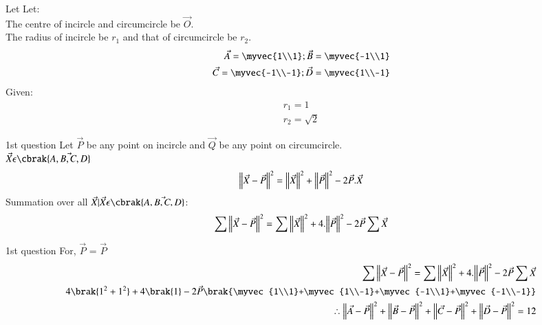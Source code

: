 \documentclass{beamer}
\begin{document}
\begin{frame}{Let}
Let:\\
The centre of incircle and circumcircle be $\vec{O}$.\\
The radius of incircle be $r_1$ and that of circumcircle be $r_2$.
\begin{align}
    \vec{A}=\myvec{1\\1};\vec{B}=\myvec{-1\\1}\\
    \vec{C}=\myvec{-1\\-1};\vec{D}=\myvec{1\\-1}
\end{align}
Given:
\begin{align}
    r_1 = 1\\
    r_2 = \sqrt{2}
\end{align}
\end{frame}

\begin{frame}{1st question}
Let $\vec{P}$ be any point on incircle and $\vec{Q}$ be any point on circumcircle.\\
$\vec{X}\epsilon \cbrak{\vec{A,B,C,D}}$
\begin{align}
    \norm{\vec{X}-\vec{P}}^2 = \norm{\vec{X}}^2 + \norm{\vec{P}}^2 - 2\vec{P}.\vec{X}\\
\end{align}
Summation over all $\vec{X}|\vec{X}\epsilon \cbrak{\vec{A,B,C,D}}$:
\begin{align}
    \sum \norm{\vec{X}-\vec{P}}^2 = \sum \norm{\vec{X}}^2 + 4.\norm{\vec{P}}^2 -2\vec{P}\sum \vec{X}\\
\end{align}
\end{frame}

\begin{frame}{1st question}
For, $\vec{P}$ = $\vec{P}$
\begin{align}
    \sum \norm{\vec{X}-\vec{P}}^2 = \sum \norm{\vec{X}}^2 + 4.\norm{\vec{P}}^2 -2\vec{P}\sum \vec{X}\\
    4\brak{1^2+1^2} + 4\brak{1}-2\vec{P}\brak{\myvec{1\\1}+\myvec{1\\-1}+\myvec{-1\\1}+\myvec{-1\\-1}}\\
    \therefore \norm{\vec{A}-\vec{P}}^2+\norm{\vec{B}-\vec{P}}^2+\norm{\vec{C}-\vec{P}}^2+\norm{\vec{D}-\vec{P}}^2 = 12
\end{align}
\end{frame}
\end{document}
